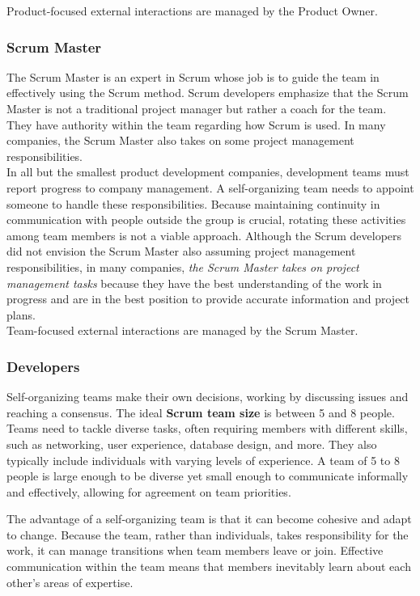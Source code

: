 Product-focused external interactions are managed by the Product Owner.

\subsubsection{Scrum Master}

The Scrum Master is an expert in Scrum whose job is to guide the team in effectively using the Scrum method. Scrum developers emphasize that the Scrum Master is not a traditional project manager but rather a coach for the team. They have authority within the team regarding how Scrum is used. In many companies, the Scrum Master also takes on some project management responsibilities. \\

In all but the smallest product development companies, development teams must report progress to company management. A self-organizing team needs to appoint someone to handle these responsibilities. Because maintaining continuity in communication with people outside the group is crucial, rotating these activities among team members is not a viable approach. Although the Scrum developers did not envision the Scrum Master also assuming project management responsibilities, in many companies, \textit{the Scrum Master takes on project management tasks} because they have the best understanding of the work in progress and are in the best position to provide accurate information and project plans. \\

Team-focused external interactions are managed by the Scrum Master.

\subsubsection{Developers}

Self-organizing teams make their own decisions, working by discussing issues and reaching a consensus. The ideal \textbf{Scrum team size} is between 5 and 8 people. Teams need to tackle diverse tasks, often requiring members with different skills, such as networking, user experience, database design, and more. They also typically include individuals with varying levels of experience. A team of 5 to 8 people is large enough to be diverse yet small enough to communicate informally and effectively, allowing for agreement on team priorities.

The advantage of a self-organizing team is that it can become cohesive and adapt to change. Because the team, rather than individuals, takes responsibility for the work, it can manage transitions when team members leave or join. Effective communication within the team means that members inevitably learn about each other’s areas of expertise. \\

